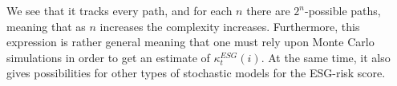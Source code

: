 We see that it tracks every path, and for each $n$ there are $2^{n}$-possible paths, meaning that as $n$ increases the complexity increases. Furthermore, this expression is rather general meaning that one must rely upon Monte Carlo simulations in order to get an estimate of $\kappa_{t}^{ESG}(i)$. At the same time, it also gives possibilities for other types of stochastic models for the ESG-risk score. 




